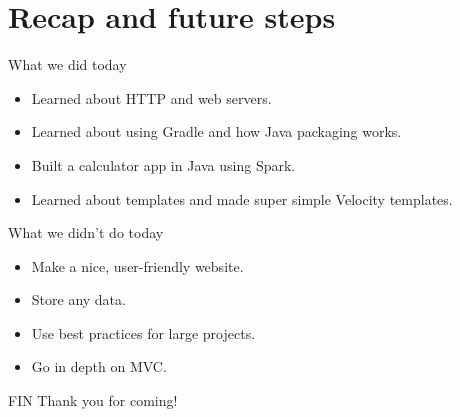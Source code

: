 \section{Recap and future steps}

\begin{frame}{What we did today}
\begin{itemize}
    \item Learned about HTTP and web servers.
    \item Learned about using Gradle and how Java packaging works.
    \item Built a calculator app in Java using Spark.
    \item Learned about templates and made super simple Velocity templates.
\end{itemize}
\end{frame}

\begin{frame}{What we didn't do today}
\begin{itemize}
    \item Make a nice, user-friendly website.
    \item Store any data.
    \item Use best practices for large projects.
    \item Go in depth on MVC.
\end{itemize}
\end{frame}

\begin{frame}{FIN}
Thank you for coming!
\end{frame}